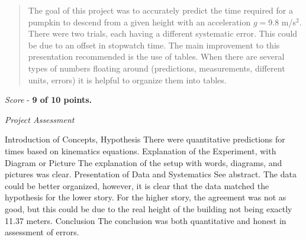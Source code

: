 \documentclass[10pt]{article}
\begin{document}
\maketitle

\begin{abstract}
The goal of this project was to accurately predict the time required for a pumpkin to descend from a given height with an acceleration $g = 9.8$ m/s$^2$.  There were two trials, each having a different systematic error.  This could be due to an offset in stopwatch time.  The main improvement to this presentation recommended is the use of tables.  When there are several types of numbers floating around (predictions, measurements, different units, errors) it is helpful to organize them into tables.
\end{abstract}

\textit{Score} - \textbf{9 of 10 points.}

\textit{Project Assessment}
\begin{outline}[enumerate]
\1 Introduction of Concepts, Hypothesis
\2 There were quantitative predictions for times based on kinematics equations.
\1 Explanation of the Experiment, with Diagram or Picture
\2 The explanation of the setup with words, diagrams, and pictures was clear.
\1 Presentation of Data and Systematics
\2 See abstract.  The data could be better organized, however, it is clear that the data matched the hypothesis for the lower story.  For the higher story, the agreement was not as good, but this could be due to the real height of the building not being exactly 11.37 meters.
\1 Conclusion
\2 The conclusion was both quantitative and honest in assessment of errors.
\end{outline}
\end{document}
